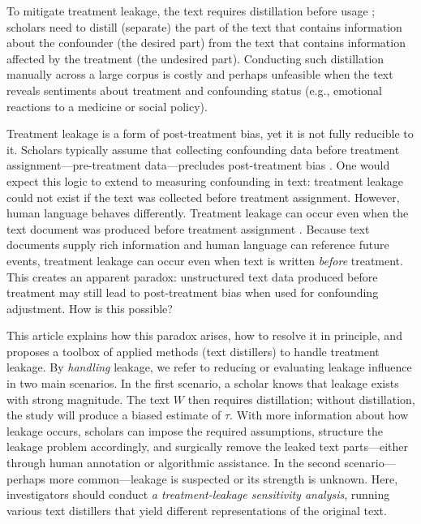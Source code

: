\documentclass[11pt]{article}
\begin{document}
To mitigate treatment leakage, the text requires distillation before usage \citep{daoud2022conceptualizing}; scholars need to distill (separate) the part of the text that contains information about the confounder (the desired part) from the text that contains information affected by the treatment (the undesired part). Conducting such distillation manually across a large corpus is costly and perhaps unfeasible when the text reveals sentiments about treatment and confounding status (e.g., emotional reactions to a medicine or social policy).

Treatment leakage is a form of post-treatment bias, yet it is not fully reducible to it. Scholars typically assume that collecting confounding data before treatment assignment---pre-treatment data---precludes post-treatment bias \citep{Pearl2015}. One would expect this logic to extend to measuring confounding in text: treatment leakage could not exist if the text was collected before treatment assignment. However, human language behaves differently. Treatment leakage can occur even when the text document was produced before treatment assignment \citep{daoud2022conceptualizing}. Because text documents supply rich information and human language can reference future events, treatment leakage can occur even when text is written \textit{before} treatment. This creates an apparent paradox: unstructured text data produced before treatment may still lead to post-treatment bias when used for confounding adjustment. How is this possible?


This article explains how this paradox arises, how to resolve it in principle, and proposes a toolbox of applied methods (text distillers) to handle treatment leakage. By \textit{handling} leakage, we refer to reducing or evaluating leakage influence in two main scenarios. In the first scenario, a scholar knows that leakage exists with strong magnitude. The text $W$ then requires distillation; without distillation, the study will produce a biased estimate of $\tau$. With more information about how leakage occurs, scholars can impose the required assumptions, structure the leakage problem accordingly, and surgically remove the leaked text parts---either through human annotation or algorithmic assistance. In the second scenario---perhaps more common---leakage is suspected or its strength is unknown. Here, investigators should conduct \textit{a treatment-leakage sensitivity analysis}, running various text distillers that yield different representations of the original text.
\end{document}
